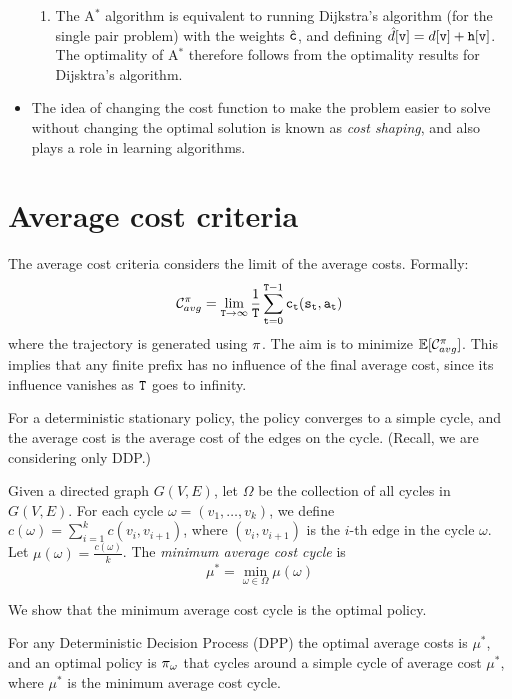 \begin{itemize}
\begin{enumerate}
      \item The A$^*$ algorithm is equivalent to running Dijkstra's algorithm (for the single pair problem) with the weights $\hat{{\tt c}}$, and defining $\hat{d}[{\tt v}] = d[{\tt v}] + {\tt h}[{\tt v}]$. The optimality of A$^*$ therefore follows from the optimality results for Dijsktra's algorithm.
  \end{enumerate}
  \item The idea of changing the cost function to make the problem easier to solve without changing the optimal solution is known as \textit{cost shaping}, and also plays a role in learning algorithms.
\end{itemize}

\section{Average cost criteria}

The average cost criteria considers the limit of the average costs.
Formally:
\[
\mathcal{C}_{avg}^\pi=\lim_{{\tt T}\rightarrow \infty}
\frac{1}{{\tt T}} \sum_{{\tt t}=0}^{{\tt T}-1}
{\tt c}_{\tt t}({\tt s}_{\tt t},{\tt a}_{\tt t})
\]
where the trajectory is generated using $\pi$. The aim is to
minimize $\mathbb{E}[\mathcal{C}^\pi_{avg}]$. This implies that any finite
prefix has no influence of the final average cost, since its
influence vanishes as ${\tt T}$ goes to infinity.

For a deterministic stationary policy, the policy converges to a
simple cycle, and the average cost is the average cost of the edges
on the cycle. (Recall, we are considering only DDP.)

Given a directed graph $G(V,E)$, let $\Omega$ be the collection of
all cycles in $G(V,E)$. For each cycle $\omega=(v_1, \ldots ,
v_{k})$, we define $c(\omega)=\sum_{i=1}^k c(v_i,v_{i+1})$, where
$(v_i,v_{i+1})$ is the $i$-th edge in the cycle $\omega$. Let
$\mu(\omega)=\frac{c(\omega)}{k}$. The {\em minimum average cost cycle}
is
\[
\mu^*=\min_{\omega\in\Omega} \mu(\omega)
\]

We show that the minimum average cost cycle is the optimal policy.
\begin{theorem}
For any Deterministic Decision Process (DPP) the optimal average
costs is $\mu^*$, and an optimal policy is $\pi_{\omega}$ that
cycles around a simple cycle of average cost $\mu^*$, where $\mu^*$ is the minimum average cost cycle.
\end{theorem}

